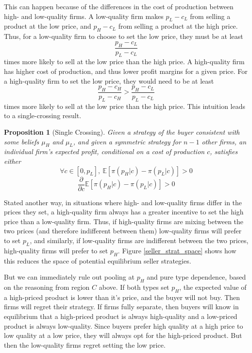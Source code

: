 \documentclass[12pt]{article}
\newtheorem{proposition}{Proposition}
\begin{document}
This can happen because of the differences in the cost of production between high- and low-quality firms. A low-quality firm makes $p_L-c_L$ from selling a product at the low price, and $p_H-c_L$ from selling a product at the high price. Thus, for a low-quality firm to choose to set the low price, they must be at least 
\[ \frac{p_H-c_L}{p_L-c_L} \]
times more likely to sell at the low price than the high price. A high-quality firm has higher cost of production, and thus lower profit margins for a given price. For a high-quality firm to set the low price, they would need to be at least
\[ \frac{p_H-c_H}{p_L-c_H} > \frac{p_H-c_L}{p_L-c_L} \]
times more likely to sell at the low price than the high price. This intuition leads to a single-crossing result.

\begin{proposition}[Single Crossing]
Given a strategy of the buyer consistent with some beliefs $\mu_H$ and $\mu_L$, and given a symmetric strategy for $n-1$ other firms, an individual firm's expected profit, conditional on a cost of production $c$, satisfies either
\[ \forall c \in [0,p_L], \ \mathbb{E}[\pi(p_H|c) - \pi(p_L|c)] > 0\]  \[ \frac{\partial}{\partial c} \mathbb{E}[\pi(p_H|c) - \pi(p_L|c)] > 0 \]
\end{proposition}

Stated another way, in situations where high- and low-quality firms differ in the prices they set, a high-quality firm always has a greater incentive to set the high price than a low-quality firm. Thus, if high-quality firms are mixing between the two prices (and therefore indifferent between them) low-quality firms will prefer to set $p_L$, and similarly, if low-quality firms are indifferent between the two prices, high-quality firms will prefer to set $p_H$. Figure \ref{seller_strat_space} shows how this reduces the space of potential equilibrium seller strategies.



But we can immediately rule out pooling at $p_H$ and pure type dependence, based on the reasoning from region $C$ above. If both types set $p_H$, the expected value of a high-priced product is lower than it's price, and the buyer will not buy. Then firms will regret their strategy. If firms fully separate, then buyers will know in equilibrium that a high-priced product is always high-quality and a low-priced product is always low-quality. Since buyers prefer high quality at a high price to low quality at a low price, they will always opt for the high-priced product. But then the low-quality firms regret setting the low price. 
\end{document}
